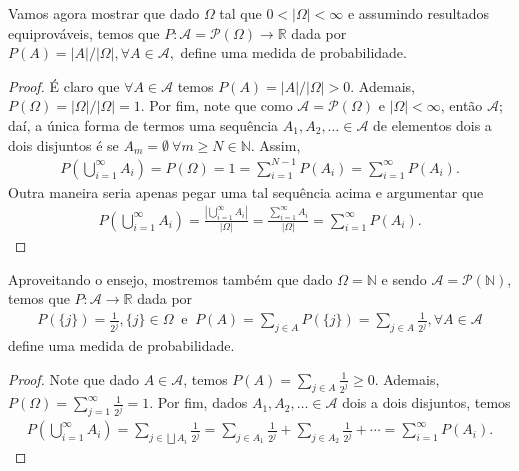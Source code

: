 \documentclass[../Notas.tex]{subfiles}
\begin{document}
Vamos agora mostrar que dado $\Omega$ tal que $0 < |\Omega| < \infty$ e assumindo resultados equiprováveis, temos que $P:\mathcal{A} = \mathcal{P}(\Omega) \to \mathbb{R}$ dada por $P(A) = |A|/|\Omega|, \forall A\in\mathcal{A},$ define uma medida de probabilidade.
\begin{proof}
É claro que $\forall A\in\mathcal{A}$ temos $P(A) = |A|/|\Omega| > 0$. Ademais, $P(\Omega) = |\Omega|/|\Omega| = 1$. Por fim, note que como $\mathcal{A} = \mathcal{P}(\Omega)$ e $|\Omega| < \infty$, então $\mathcal{A}$; daí, a única forma de termos uma sequência $A_1, A_2, \dots \in\mathcal{A}$ de elementos dois a dois disjuntos é se $A_m = \emptyset \ \forall m\geq N\in\mathbb{N}$. Assim, 
\begin{align*}
    P\left( \bigcup_{i=1}^{\infty}A_i \right) = P(\Omega) = 1 = \sum_{i=1}^{N-1}P(A_i) = \sum_{i=1}^{\infty}P(A_i).
\end{align*}
Outra maneira seria apenas pegar uma tal sequência acima e argumentar que
\begin{align*}
    P\left( \bigcup_{i=1}^{\infty}A_i \right) = \frac{\left| \bigcup_{i=1}^{\infty}A_i \right|}{|\Omega|} = \frac{\sum_{i=1}^{\infty}A_i}{|\Omega|} = \sum_{i=1}^{\infty}P(A_i).
\end{align*}
\end{proof}

Aproveitando o ensejo, mostremos também que dado $\Omega = \mathbb{N}$ e sendo $\mathcal{A} = \mathcal{P}(\mathbb{N})$, temos que $P:\mathcal{A}\to\mathbb{R}$ dada por 
\begin{align*}
    \displaystyle{P(\{ j \}) = \frac{1}{2^j}, \{j\}\in\Omega} \ \text{ e } \ 
    P(A) = \sum_{j\in A}P(\{ j \}) = \sum_{j\in A}\frac{1}{2^j}, \forall A\in\mathcal{A}
\end{align*}
define uma medida de probabilidade.
\begin{proof}
Note que dado $A\in\mathcal{A}$, temos $P(A) = \displaystyle{\sum_{j\in A} \frac{1}{2^j}}\geq 0$. Ademais, $P(\Omega) = \displaystyle{ \sum_{j=1}^{\infty}\frac{1}{2^j} = 1}$. Por fim, dados $A_1, A_2, \dots \in \mathcal{A}$ dois a dois disjuntos, temos
\begin{align*}
    P\left( \bigcup_{i=1}^{\infty} A_i \right) = \sum_{j\in\bigsqcup A_i} \frac{1}{2^j} = \sum_{j\in A_1} \frac{1}{2^j} + \sum_{j\in A_2} \frac{1}{2^j} + \cdots = \sum_{i=1}^{\infty}P(A_i).
\end{align*}
\end{proof}
\end{document}
